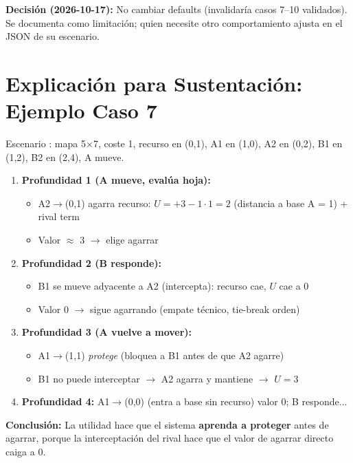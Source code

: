 \textbf{Decisión (2026-10-17):} No cambiar defaults (invalidaría casos 7--10 validados).
Se documenta como limitación; quien necesite otro comportamiento ajusta
 en el JSON de su escenario.

\section{Explicación para Sustentación: Ejemplo Caso 7}
\label{sec:ejemplo-caso7}

Escenario : mapa 5$\times$7, coste 1, recurso en
(0,1), A1 en (1,0), A2 en (0,2), B1 en (1,2), B2 en (2,4), A mueve.

\begin{enumerate}
\item \textbf{Profundidad 1 (A mueve, evalúa hoja):}
  \begin{itemize}
  \item A2$\to$(0,1) agarra recurso: $U = +3 - 1\cdot1 = 2$ (distancia a base A = 1) + rival term
  \item Valor $\approx$ 3 $\to$ elige agarrar
  \end{itemize}
\item \textbf{Profundidad 2 (B responde):}
  \begin{itemize}
  \item B1 se mueve adyacente a A2 (intercepta): recurso cae, $U$ cae a 0
  \item Valor 0 $\to$ sigue agarrando (empate técnico, tie-break orden)
  \end{itemize}
\item \textbf{Profundidad 3 (A vuelve a mover):}
  \begin{itemize}
  \item A1$\to$(1,1) \textit{protege} (bloquea a B1 antes de que A2 agarre)
  \item B1 no puede interceptar $\to$ A2 agarra y mantiene $\to$ $U = 3$
  \end{itemize}
\item \textbf{Profundidad 4:} A1$\to$(0,0) (entra a base sin recurso) valor 0; B responde...
\end{enumerate}

\textbf{Conclusión:} La utilidad hace que el sistema \textbf{aprenda a proteger} antes de
agarrar, porque la interceptación del rival hace que el valor de agarrar directo caiga a 0.
